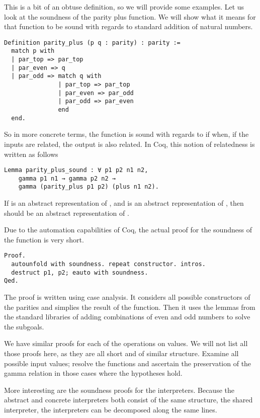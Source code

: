 This is a bit of an obtuse definition, so we will provide some examples. Let us
look at the soundness of the parity plus function. We will show what it
means for that function to be sound with regards to standard addition of
natural numbers.

\begin{verbatim}
Definition parity_plus (p q : parity) : parity :=
  match p with 
  | par_top => par_top
  | par_even => q
  | par_odd => match q with
               | par_top => par_top
               | par_even => par_odd
               | par_odd => par_even
               end
  end.
\end{verbatim}

So in more concrete terms, the function  is sound with 
regards to 
if when, if the inputs are related, the output is also related. In Coq, this 
notion of relatedness is written as follows

\begin{verbatim}
Lemma parity_plus_sound : ∀ p1 p2 n1 n2, 
    gamma p1 n1 → gamma p2 n2 → 
    gamma (parity_plus p1 p2) (plus n1 n2).
\end{verbatim}

If  is an abstract representation of , and  is an 
abstract representation of , then  should be an 
abstract representation of . 

Due to the automation capabilities of Coq, the actual proof for the soundness
of the  function is very short.

\begin{verbatim}
Proof. 
  autounfold with soundness. repeat constructor. intros.
  destruct p1, p2; eauto with soundness.
Qed.
\end{verbatim}

The proof is written using case analysis. It considers all possible
constructors of the parities and simplies the result of the 
function. Then it uses the lemmas from the standard libraries of adding 
combinations of even and odd numbers to solve the subgoals.

We have similar proofs for each of the operations on values. We will not list
all those proofs here, as they are all short and of similar structure. Examine
all possible input values; resolve the functions and ascertain the preservation
of the gamma relation in those cases where the hypotheses hold.

More interesting are the soundness proofs for the interpreters. Because the
abstract and concrete interpreters both consist of the same structure, the
shared interpreter, the interpreters can be decomposed along the same lines.

